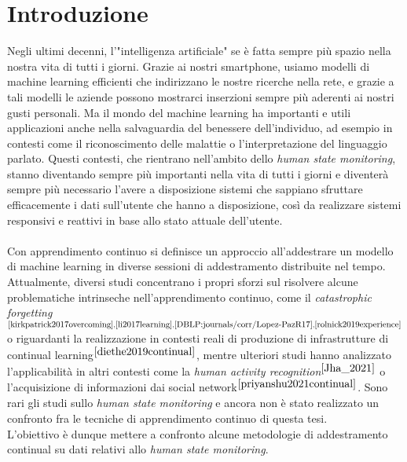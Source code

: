 \chapter*{Introduzione}

Negli ultimi decenni, l'"intelligenza artificiale" se è fatta sempre più spazio nella nostra vita di tutti i giorni. Grazie ai nostri smartphone, usiamo modelli di machine learning efficienti che indirizzano le nostre ricerche nella rete, e grazie a tali modelli le aziende possono mostrarci inserzioni sempre più aderenti ai nostri gusti personali. Ma il mondo del machine learning ha importanti e utili applicazioni anche nella salvaguardia del benessere dell'individuo, ad esempio in contesti come il riconoscimento delle malattie o l'interpretazione del linguaggio parlato. Questi contesti, che rientrano nell'ambito dello \textit{human state monitoring}, stanno diventando sempre più importanti nella vita di tutti i giorni e diventerà sempre più necessario l'avere a disposizione sistemi che sappiano sfruttare efficacemente i dati sull'utente che hanno a disposizione, così da realizzare sistemi responsivi e reattivi in base allo stato attuale dell'utente.\\\\
Con apprendimento continuo si definisce un approccio all'addestrare un modello di machine learning in diverse sessioni di addestramento distribuite nel tempo. Attualmente, diversi studi concentrano i propri sforzi sul risolvere alcune problematiche intrinseche nell'apprendimento continuo, come il \textit{catastrophic forgetting}$^{\cite{kirkpatrick2017overcoming},\cite{li2017learning},\cite{DBLP:journals/corr/Lopez-PazR17},\cite{rolnick2019experience}}$ o riguardanti la realizzazione in contesti reali di produzione di infrastrutture di continual learning$^{\cite{diethe2019continual}}$, mentre ulteriori studi hanno analizzato l'applicabilità in altri contesti come la \textit{human activity recognition}$^{\cite{Jha_2021}}$ o l'acquisizione di informazioni dai social network$^{\cite{priyanshu2021continual}}$. Sono rari gli studi sullo \textit{human state monitoring} e ancora non è stato realizzato un confronto fra le tecniche di apprendimento continuo di questa tesi.\\
L'obiettivo è dunque mettere a confronto alcune metodologie di addestramento continual su dati relativi allo \textit{human state monitoring}.
\pagebreak
